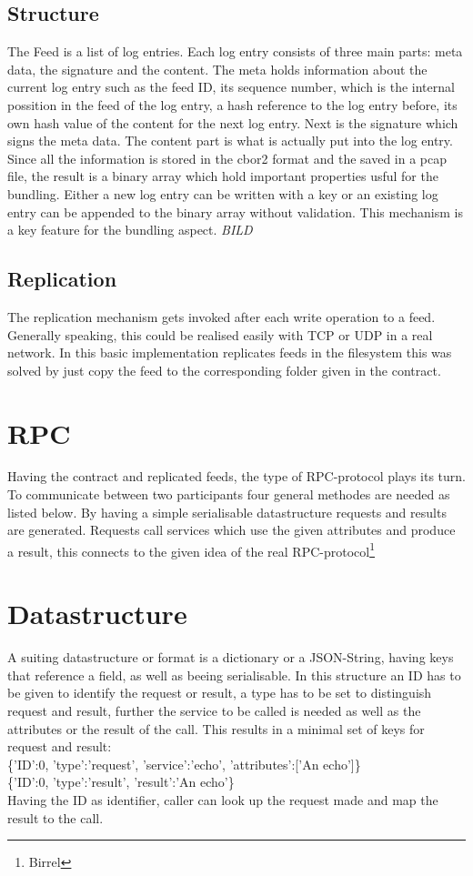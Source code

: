 \subsection{Structure}
The Feed is a list of log entries. Each log entry consists of three main parts: meta data, the signature and the content. The meta holds information about the current log entry such as the feed ID, its sequence number, which is the internal possition in the feed of the log entry, a hash reference to the log entry before, its own hash value of the content for the next log entry. Next is the signature which signs the meta data. The content part is what is actually put into the log entry.\\
Since all the information is stored in the cbor2 format and the saved in a pcap file, the result is a binary array which hold important properties usful for the bundling. Either a new log entry can be written with a key or an existing log entry can be appended to the binary array without validation. This mechanism is a key feature for the bundling aspect.
\textit{BILD}
\subsection{Replication}
The replication mechanism gets invoked after each write operation to a feed. Generally speaking, this could be realised easily with TCP or UDP in a real network. In this basic implementation replicates feeds in the filesystem this was solved by just copy the feed to the corresponding folder given in the contract.
\section{RPC}
Having the contract and replicated feeds, the type of RPC-protocol plays its turn. To communicate between two participants four general methodes are needed as listed below. By having a simple serialisable datastructure requests and results are generated. Requests call services which use the given attributes and produce a result, this connects to the given idea of the real RPC-protocol\footnote{Birrel}
\section{Datastructure}
A suiting datastructure or format is a dictionary or a JSON-String, having keys that reference a field, as well as beeing serialisable. In this structure an ID has to be given to identify the request or result, a type has to be set to distinguish request and result, further the service to be called is needed as well as the attributes or the result of the call. This results in a minimal set of keys for request and result:\\
\{'ID':0, 'type':'request', 'service':'echo', 'attributes':['An echo']\}\\
\{'ID':0, 'type':'result', 'result':'An echo'\}\\
Having the ID as identifier, caller can look up the request made and map the result to the call.
